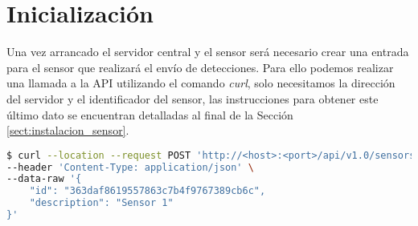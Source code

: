 \documentclass[../proyecto.tex]{subfiles}
\begin{document}
\section{Inicialización }

Una vez arrancado el servidor central y el sensor será necesario crear una entrada para el sensor que realizará el envío de detecciones. Para ello podemos realizar una llamada a la API utilizando el comando \textit{curl}, solo necesitamos la dirección del servidor y el identificador del sensor, las instrucciones para obtener este último dato se encuentran detalladas al final de la Sección \autoref{sect:instalacion_sensor}.\\

\begin{minipage}{\linewidth}
\begin{lstlisting}[language=bash, caption=Llamada a la API para añadir un nuevo sensor al sistema, captionpos=b, frame=single]
$ curl --location --request POST 'http://<host>:<port>/api/v1.0/sensors/' \
--header 'Content-Type: application/json' \
--data-raw '{
    "id": "363daf8619557863c7b4f9767389cb6c",
    "description": "Sensor 1"
}'
\end{lstlisting}
\end{minipage}
\end{document}
